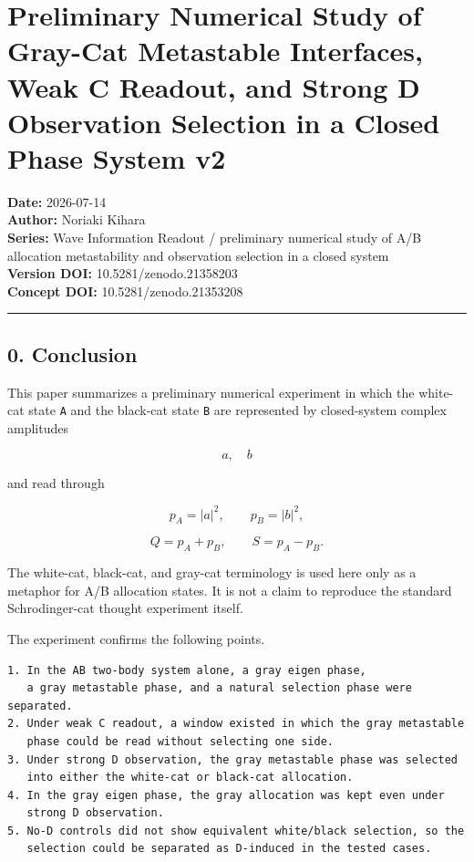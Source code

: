 \documentclass{article}
\begin{document}
\section{Preliminary Numerical Study of Gray-Cat Metastable Interfaces,
Weak C Readout, and Strong D Observation Selection in a Closed Phase
System
v2}\label{preliminary-numerical-study-of-gray-cat-metastable-interfaces-weak-c-readout-and-strong-d-observation-selection-in-a-closed-phase-system-v2}

\textbf{Date:} 2026-07-14\\
\textbf{Author:} Noriaki Kihara\\
\textbf{Series:} Wave Information Readout / preliminary numerical study
of A/B allocation metastability and observation selection in a closed
system\\
\textbf{Version DOI:} 10.5281/zenodo.21358203\\
\textbf{Concept DOI:} 10.5281/zenodo.21353208

\begin{center}\rule{0.5\linewidth}{0.5pt}\end{center}

\subsection{0. Conclusion}\label{conclusion}

This paper summarizes a preliminary numerical experiment in which the
white-cat state \texttt{A} and the black-cat state \texttt{B} are
represented by closed-system complex amplitudes

\[
a,\quad b
\]

and read through

\[
p_A=|a|^2,\qquad p_B=|b|^2,
\]

\[
Q=p_A+p_B,\qquad S=p_A-p_B.
\]

The white-cat, black-cat, and gray-cat terminology is used here only as
a metaphor for A/B allocation states. It is not a claim to reproduce the
standard Schrodinger-cat thought experiment itself.

The experiment confirms the following points.

\begin{verbatim}
1. In the AB two-body system alone, a gray eigen phase,
   a gray metastable phase, and a natural selection phase were separated.
2. Under weak C readout, a window existed in which the gray metastable
   phase could be read without selecting one side.
3. Under strong D observation, the gray metastable phase was selected
   into either the white-cat or black-cat allocation.
4. In the gray eigen phase, the gray allocation was kept even under
   strong D observation.
5. No-D controls did not show equivalent white/black selection, so the
   selection could be separated as D-induced in the tested cases.
\end{verbatim}
\end{document}
